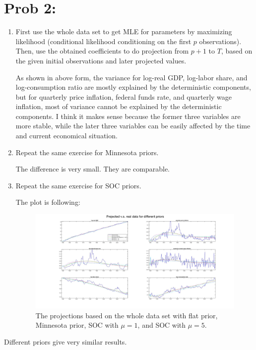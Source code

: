 \documentclass[11pt, oneside]{article}   	%
\begin{document}
\section{Prob 2:}
\begin{enumerate}[(1)]
\item
First use the whole data set to get MLE for parameters by maximizing likelihood (conditional likelihood conditioning on the first $p$ observations). Then, use the obtained coefficients to do projection from $p+1$ to $T$, based on the given initial observations and later projected values.

   
As shown in above form, the variance for log-real GDP, log-labor share, and log-consumption ratio are mostly explained by the deterministic components, but for quarterly price inflation, federal funds rate, and quarterly wage inflation, most of variance cannot be explained by the deterministic components. I think it makes sense because the former three variables are more stable, while the later three variables can be easily affected by the time and current economical situation.
\item
Repeat the same exercise for Minnesota priors.

The difference is very small. They are comparable.
\item
Repeat the same exercise for SOC priors.

The plot is following:
\begin{figure}[!ht]
\begin{center}
\includegraphics[width = 1.0\textwidth]{part2.jpg}
\captionsetup{width=0.8\textwidth}
\caption{The projections based on the whole data set with flat prior, Minnesota prior, SOC with $ \mu=1$, and SOC with $ \mu=5$.}
\end{center}
\end{figure}
\end{enumerate}
Different priors give very similar results.
\end{document}
